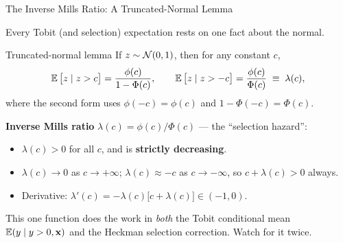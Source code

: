\documentclass[aspectratio=169, 12pt]{beamer}
\begin{document}
\begin{frame}[shrink=8]{The Inverse Mills Ratio: A Truncated-Normal Lemma}

  Every Tobit (and selection) expectation rests on one fact about the normal.

  \begin{definitionbox}{Truncated-normal lemma}
    If $z\sim\mathcal{N}(0,1)$, then for any constant $c$,
    \[
      \operatorname{\mathbb{E}}\big[z \mid z > c\big] = \frac{\phi(c)}{1-\Phi(c)},
      \qquad
      \operatorname{\mathbb{E}}\big[z \mid z > -c\big] = \frac{\phi(c)}{\Phi(c)} \;\equiv\; \lambda(c),
    \]
    where the second form uses $\phi(-c)=\phi(c)$ and $1-\Phi(-c)=\Phi(c)$.
  \end{definitionbox}

  \smallskip

  \begin{keybox}
    \textbf{Inverse Mills ratio} $\lambda(c)=\phi(c)/\Phi(c)$ --- the ``selection hazard'':
    \begin{itemize}
      \item $\lambda(c) > 0$ for all $c$, and is \textbf{strictly decreasing}.
      \item $\lambda(c)\to 0$ as $c\to+\infty$; $\lambda(c)\approx -c$ as
        $c\to-\infty$, so $c+\lambda(c)>0$ always.
      \item Derivative: $\lambda'(c) = -\lambda(c)\big[c+\lambda(c)\big]\in(-1,0)$.
    \end{itemize}
  \end{keybox}

  \smallskip

  \begin{highlightbox}
    \small
    This one function does the work in \emph{both} the Tobit conditional mean
    $\operatorname{\mathbb{E}}(y\mid y>0,\mathbf{x})$ and the Heckman selection correction. Watch for it twice.
  \end{highlightbox}

\end{frame}
\end{document}
